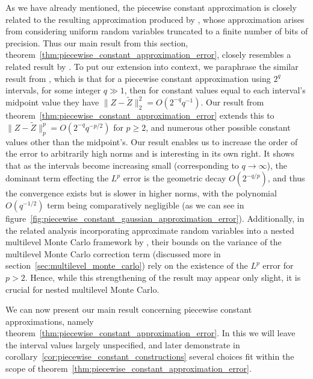 \documentclass[manuscript,review]{acmart}
\begin{document}
As we have already mentioned, the piecewise constant approximation is closely related to the resulting approximation produced by \citet{giles2019random_quadrature}, whose approximation arises from considering uniform random variables truncated to a finite number of bits of precision. Thus our main result from this section, theorem~\ref{thm:piecewise_constant_approximation_error}, closely resembles a related result by \citet[theorem~1]{giles2019random_quadrature}. To put our extension into context, we paraphrase the similar result from \citet{giles2019random_quadrature}, which is that for a piecewise constant approximation using $ 2^q $ intervals, for some integer $ q \gg 1 $, then for constant values equal to each interval's midpoint value they have $ \lVert Z - \widetilde{Z}\rVert_2^2 = O(2^{-q}q^{-1}) $. Our result from theorem~\ref{thm:piecewise_constant_approximation_error} extends this to $ \lVert Z - \widetilde{Z}\rVert_p^p = O(2^{-q} q^{-p/2}) $ for $ p \geq 2 $, and numerous other possible constant values other than the midpoint's. Our result enables us to increase the order of the error to arbitrarily high norms and is interesting in its own right. It shows that as the intervals become increasing small (corresponding to $ q \to \infty $), the dominant term effecting the $ L^p $ error is the geometric decay $ O(2^{-q/p}) $, and thus the convergence exists but is slower in higher norms, with the polynomial $ O(q^{-1/2}) $ term being comparatively negligible (as we can see in figure~\ref{fig:piecewise_constant_gaussian_approximation_error}). Additionally, in the related analysis incorporating approximate random variables into a nested multilevel Monte Carlo framework by \citeauthor{giles2020approximate} \citep{giles2020approximate,sheridan2020nested}, their bounds on the variance of the multilevel Monte Carlo correction term (discussed more in section~\ref{sec:multilevel_monte_carlo}) rely on the existence of the $ L^p $ error for $ p > 2 $. Hence, while this strengthening of the result may appear only slight, it is crucial for nested multilevel Monte Carlo. 

We can now present our main result concerning piecewise constant approximations, namely theorem~\ref{thm:piecewise_constant_approximation_error}. In this we will leave the interval values largely unspecified, and later demonstrate in corollary~\ref{cor:piecewise_constant_constructions} several choices fit within the scope of theorem~\ref{thm:piecewise_constant_approximation_error}.
\end{document}
